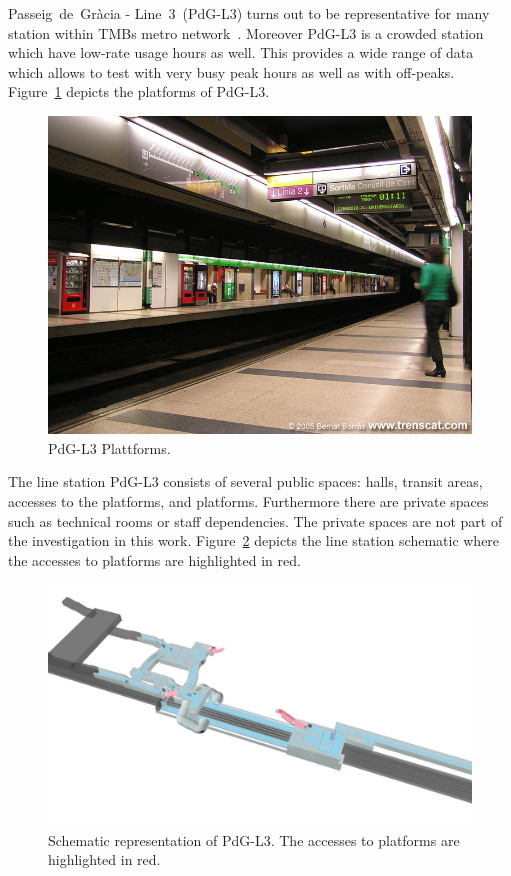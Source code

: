 Passeig~de~Gr\`{a}cia - Line~3~(PdG-L3) turns out to be representative for many station within TMBs metro network~\cite{TMB}. Moreover PdG-L3 is a crowded station which have low-rate usage hours as well. This provides a wide range of data which allows to test with very busy peak hours as well as with off-peaks. Figure~\ref{fig:PdG-L3_platforms} depicts the platforms of PdG-L3.

\begin{figure}[htb]
  \centering
  \includegraphics[width=\linewidth]{PdG-L3_platforms.jpg} 
  \caption{PdG-L3 Plattforms. \cite{TMB}}
  \label{fig:PdG-L3_platforms}
\end{figure}

The line station PdG-L3 consists of several public spaces: halls, transit areas, accesses to the platforms, and platforms. Furthermore there are private spaces such as technical rooms or staff dependencies. The private spaces are not part of the investigation in this work. Figure~\ref{fig:PdG-L3_schematic} depicts the line station schematic where the accesses to platforms are highlighted in red.

\begin{figure}[htb]
  \centering
  \includegraphics[width=\linewidth]{PdG-L3_schematic.jpg} 
  \caption{Schematic representation of PdG-L3. The accesses to platforms are highlighted in red. \cite{TMB}}
  \label{fig:PdG-L3_schematic}
\end{figure}


